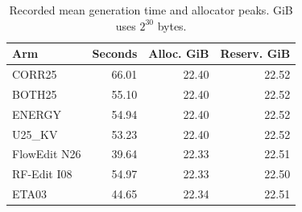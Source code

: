 \begin{table}[t]
\centering\small
\caption{Recorded mean generation time and allocator peaks. GiB uses $2^{30}$ bytes.}
\label{tab:runtime-cost}
\begin{tabular}{lrrr}
\toprule
Arm & Seconds & Alloc. GiB & Reserv. GiB\\
\midrule
CORR25 & 66.01 & 22.40 & 22.52\\
BOTH25 & 55.10 & 22.40 & 22.52\\
ENERGY & 54.94 & 22.40 & 22.52\\
U25\_KV & 53.23 & 22.40 & 22.52\\
FlowEdit N26 & 39.64 & 22.33 & 22.51\\
RF-Edit I08 & 54.97 & 22.33 & 22.50\\
ETA03 & 44.65 & 22.34 & 22.51\\
\bottomrule
\end{tabular}
\end{table}
